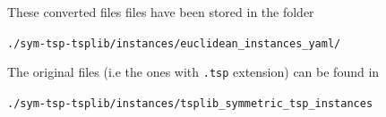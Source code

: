 \begin{appendices}
These converted files files have been stored in the folder


\begin{displayquote}
\color{blue} \Large
\begin{center}
\texttt{./sym-tsp-tsplib/instances/euclidean\_instances\_yaml/}
\end{center}
\end{displayquote}

The original files (i.e the ones with \verb|.tsp| extension) can be found in 

\begin{displayquote}
\begin{center}
\texttt{./sym-tsp-tsplib/instances/tsplib\_symmetric\_tsp\_instances}
\end{center}
\end{displayquote}


\end{appendices}
